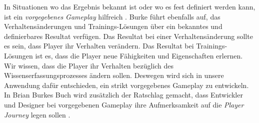 \documentclass[a4paper,12pt,twoside]{scrartcl}
\begin{document}
In Situationen wo das Ergebnis bekannt ist oder wo es fest definiert werden kann, ist ein \textit{vorgegebenes Gameplay} hilfreich \cite{gamificationDefinition}. Burke führt ebenfalls auf, das Verhaltensänderungen und Trainings-Lösungen über ein bekanntes und definierbares Resultat verfügen. Das Resultat bei einer Verhaltensänderung sollte es sein, dass Player ihr Verhalten verändern. Das Resultat bei Trainings-Lösungen ist es, dass die Player neue Fähigkeiten und Eigenschaften erlernen. Wir wissen, dass die Player ihr Verhalten bezüglich des Wissenserfassungsprozesses ändern sollen. Deswegen wird sich in unsere Anwendung dafür entschieden, ein strikt vorgegebenes Gameplay zu entwickeln. In Brian Burkes Buch wird zusätzlich der Ratschlag gemacht, dass Entwickler und Designer bei vorgegebenen Gameplay ihre Aufmerksamkeit auf die \textit{Player Journey} legen sollen \cite{gamificationDefinition}. 
\end{document}
